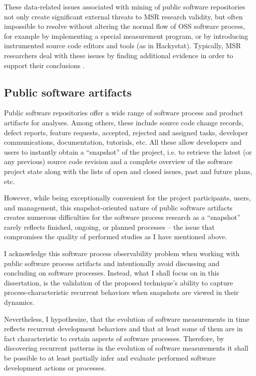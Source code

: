 These data-related issues associated with mining of public software repositories not only create significant external 
threats to MSR research validity, but often impossible to resolve without altering the normal flow of OSS software 
process, for example by implementing a special measurement program, or by introducing instrumented source code 
editors and tools (as in Hackystat). 
Typically, MSR researchers deal with these issues by finding additional evidence in order to support their conclusions 
\cite{citeulike:5043664} \cite{citeulike:5128808}.

\subsection{Public software artifacts}
Public software repositories offer a wide range of software process and product artifacts for analyses.
Among others, these include source code change records, defect reports, feature requests, accepted, 
rejected and assigned tasks, developer communications, documentation, tutorials, etc. 
All these allow developers and users to instantly obtain a ``snapshot'' of the project, i.e. to retrieve the 
latest (or any previous) source code revision and a complete overview of the software project state 
along with the lists of open and closed issues, past and future plans, etc.

However, while being exceptionally convenient for the project participants, users, and management, this 
snapshot-oriented nature of public software artifacts creates numerous difficulties for the software process research 
as a ``snapshot'' rarely reflects finished, ongoing, or planned processes -- the issue that compromises the quality of 
performed studies as I have mentioned above. 

I acknowledge this software process observability problem when working with public software process artifacts and intentionally 
avoid discussing and concluding on software processes. Instead, what I shall focus on in this dissertation, is the 
validation of the proposed technique's ability to capture process-characteristic recurrent behaviors when snapshots 
are viewed in their dynamics. 

Nevertheless, I hypothesize, that the evolution of software measurements in time reflects recurrent development behaviors 
and that at least some of them are in fact characteristic to certain aspects of software processes. 
Therefore, by discovering recurrent patterns in the evolution of software measurements it shall be possible to at least 
partially infer and evaluate performed software development actions or processes.

